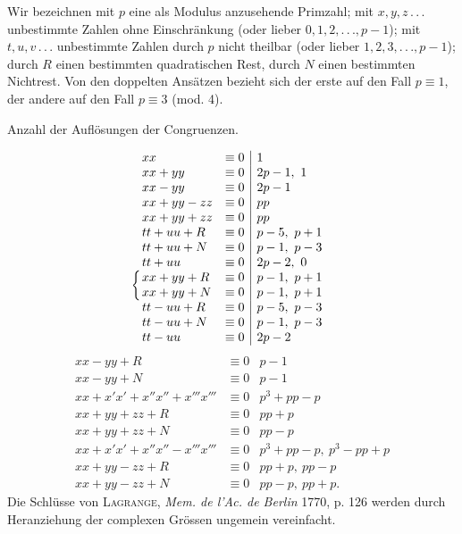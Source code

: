 \NoSourceHead
{}
\noindent\hspace*{\parindent}Wir bezeichnen mit $p$ eine als Modulus anzusehende Primzahl; mit
$x,y,z\,.\,.\,.$ unbestimmte Zahlen ohne Einschränkung (oder lieber $0,1,2,.\,.\,.,
p-1$); mit $t,u,v\,.\,.\,.$ unbestimmte Zahlen durch $p$ nicht theilbar (oder lieber
$1,2,3,.\,.\,.,p-1$); durch $R$ einen bestimmten quadratischen Rest, durch $N$
einen bestimmten Nichtrest. Von den doppelten Ansätzen bezieht sich der
erste auf den Fall $p\equiv1$, der andere auf den Fall $p\equiv3$ (mod. 4).
\begin{center}Anzahl der Auflösungen der Congruenzen.\end{center}
\[
\begin{array}{lr|l}
xx&\equiv0&1\\
xx+yy&\equiv0&2p-1,\ 1\\
xx-yy&\equiv0&2p-1\\
xx+yy-zz&\equiv0&pp\\
xx+yy+zz&\equiv0&pp\\
tt+uu+R&\equiv0&p-5,\ p+1\\
tt+uu+N&\equiv0&p-1,\ p-3\\
tt+uu&\equiv0&2p-2,\ 0\\
\llap{\smash{\raisebox{-.5\normalbaselineskip}{$\left\{\vphantom{\begin{array}{c}x\\x\end{array}}\right.$}}}xx+yy+R&\equiv0&p-1,\ p+1\\
xx+yy+N&\equiv0&p-1,\ p+1\\
tt-uu+R&\equiv0&p-5,\ p-3\\
tt-uu+N&\equiv0&p-1,\ p-3\\
tt-uu&\equiv0&2p-2
\end{array}
\]
\clearpage
{}
\[
\begin{array}{lr|l}
xx-yy+R&\equiv0&p-1\\
xx-yy+N&\equiv0&p-1\\
xx+x'x'+x''x''+x'''x'''&\equiv0&p^3+pp-p\\
xx+yy+zz+R&\equiv0&pp+p\\
xx+yy+zz+N&\equiv0&pp-p\\
xx+x'x'+x''x''-x'''x'''&\equiv0&p^3+pp-p,\ p^3-pp+p\\
xx+yy-zz+R&\equiv0&pp+p,\ pp-p\\
xx+yy-zz+N&\equiv0&pp-p,\ pp+p.
\end{array}
\]
\noindent\hspace*{\parindent}Die Schlüsse von \textsc{Lagrange}, \textit{Mem. de l’Ac. de Berlin} 1770, p. 126 werden
durch Heranziehung der complexen Grössen ungemein vereinfacht.

